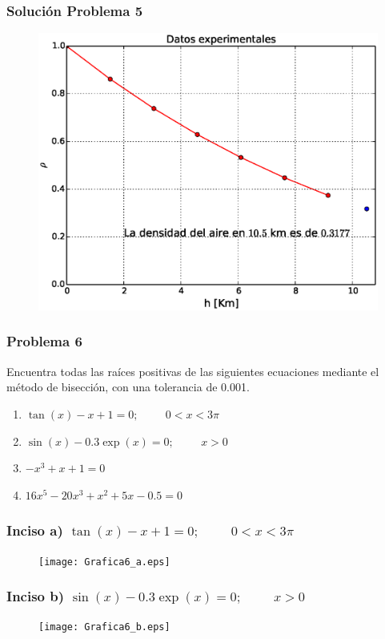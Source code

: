 \begin{frame}
\frametitle{Solución Problema 5}
\begin{figure}
	\centering
	\includegraphics[scale=0.5]{Imagenes/Problema5_01.eps} 
\end{figure}
\end{frame}
\begin{frame}
\frametitle{Problema 6}
Encuentra todas las raíces positivas de las siguientes ecuaciones mediante el método de bisección, con una tolerancia de 0.001.
	\begin{enumerate}\label{grupo1}
	\renewcommand{\arraystretch}{1.5}
		\item $\tan(x) - x + 1 = 0; \hspace{1cm} 0 < x < 3\pi$
		\item $\sin(x) - 0.3 \exp(x) = 0; \hspace{1cm} x > 0$
		\item $-x^{3} + x + 1 = 0$
		\item $16x^{5} - 20x^{3} + x^{2} + 5x - 0.5 = 0$
	\end{enumerate}
\end{frame}
\begin{frame}
\frametitle{Inciso a) $\tan(x) - x + 1 = 0; \hspace{1cm} 0 < x < 3\pi$}
\begin{figure}
	\centering
	\texttt{[image: Grafica6\_a.eps]}
\end{figure}
\end{frame}
\begin{frame}
\frametitle{Inciso b) $\sin(x) - 0.3 \exp(x) = 0; \hspace{1cm} x > 0$}
\begin{figure}
	\centering
	\texttt{[image: Grafica6\_b.eps]}
\end{figure}
\end{frame}
